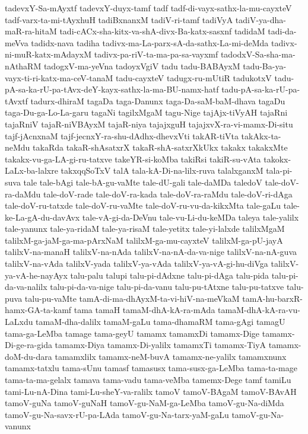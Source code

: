 {tadevxY-Sa-mAyxtf
tadevxY-duyx-tamf
tadf
tadf-di-vayx-sathx-la-mu-cayxteV
tadf-varx-ta-mi-tAyxhuH
tadiBxnanxM
tadiV-ri-tamf
tadiVyA
tadiV-ya-dha-maR-ra-hitaM
tadi-cACx-sha-kitx-va-shA-divx-Ba-katx-sasxnf
tadidaM
tadi-da-meVva
tadidx-nava
tadiha
tadivx-ma-La-parx-sA-da-sathx-La-mi-deMda
tadivx-ni-muR-katx-mAdayxM
tadivx-pa-riV-ta-ma-pa-sa-vayxmf
tadodxV-Sa-sha-ma-nAthaRM
tadogxV-ma-yeVna
tadoyxVgiV
tadu
tadu-BABAyxM
tadu-Ba-ya-vayx-ti-ri-katx-ma-ceV-tanaM
tadu-cayxteV
tadugx-ru-mUtiR
tadukotxV
tadu-pA-sa-ka-rU-pa-tAvx-deY-kayx-sathx-la-ma-BU-namx-hatf
tadu-pA-sa-ka-rU-pa-tAvxtf
tadurx-dhiraM
tagaDa
taga-Danunx
taga-Da-saM-baM-dhava
tagaDu
taga-Du-ga-Lo-La-garu
tagaNi
tagilxMgaM
tagu-Nige
tajAjx-tiVyAH
tajaRni
tajaRniV
tajaR-niVBAyxM
tajaR-niya
tajajxguH
tajajxvX-ra-vi-mamx-Di-situ
tajf-jAcnxnaM
tajf-jecnxY-ra-shu-dAdhx-dhevxVti
takAR-tiVta
takAkx-ta-neMdu
takaRda
takaR-shAsatxrX
takaR-shA-satxrXkUkx
takakx
takakxMte
takakx-vu-ga-LA-gi-ru-tatxve
takeYR-si-koMba
takiRsi
takiR-su-vAta
takokx-LaLx-ba-lalxre
takxqqSoTxV
talA
tala-kA-Di-na-lilx-ruva
talalxganxM
tala-pi-suva
tale
tale-bAgi
tale-bA-gu-vaMte
tale-dU-gali
tale-daMDa
taledoV
tale-doV-ra-daMdu
tale-doV-rade
tale-doV-ra-kada
tale-doV-ra-raMdu
tale-doV-ri-dAga
tale-doV-ru-tatxde
tale-doV-ru-vaMte
tale-doV-ru-vu-da-kikxMta
tale-gaLu
tale-ke-La-gA-du-davAvx
tale-vA-gi-da-DeVnu
tale-vu-Li-du-keMDa
taleya
tale-yalilx
tale-yanunx
tale-ya-ridaM
tale-ya-risaM
tale-yetitx
tale-yi-lalxde
talilxMgaM
talilxM-ga-jaM-ga-ma-pArxNaM
talilxM-ga-mu-cayxteV
talilxM-ga-pU-jayA
talilxV-na-manaH
talilxV-na-nAda
talilxV-na-nA-da-va-nige
talilxV-na-nA-guva
talilxV-na-vAda
talilxV-yada
talilxV-ya-vAda
talilxV-ya-vA-gi-hu-diVga
talilxV-ya-vA-he-nayAyx
talu-palu
talupi
talu-pi-dAdxne
talu-pi-dAga
talu-pida
talu-pi-da-va-nalilx
talu-pi-da-va-nige
talu-pi-da-vanu
talu-pu-tAtxne
talu-pu-tatxve
talu-puva
talu-pu-vaMte
tamA-di-ma-dhAyxM-ta-vi-hiV-na-meVkaM
tamA-hu-barxR-hamx-GA-ta-kamf
tama
tamaH
tamaM-dhA-kA-ra-mAda
tamaM-dhA-kA-ra-vu-LaLxdu
tamaM-dha-dalilx
tamaM-gaLu
tama-dhamaRM
tama-gAgi
tamagU
tama-ga-LeMba
tamage
tama-geyU
tamamx
tamamxDi
tamamx-Dige
tamamx-Di-ge-ra-gida
tamamx-Diya
tamamx-Di-yalilx
tamamxTi
tamamx-TiyA
tamamx-doM-du-dara
tamamxlilx
tamamx-neM-buvA
tamamx-ne-yalilx
tamamxnunx
tamamx-tatxlu
tama-sUnu
tamasf
tamasusx
tama-susx-ga-LeMba
tama-ta-mage
tama-ta-ma-gelalx
tamava
tama-vadu
tama-veMba
tamemx-Dege
tamf
tamiLu
tami-Lu-nA-Dina
tami-Lu-sheY-va-ralilx
tamoV
tamoV-BAgaM
tamoV-BAvAH
tamoV-guNa
tamoV-guNaH
tamoV-gu-NaM-ga-LeMba
tamoV-gu-Na-diMda
tamoV-gu-Na-savx-rU-pa-LAda
tamoV-gu-Na-tarx-yaM-gaLu
tamoV-gu-Na-vanunx
}
